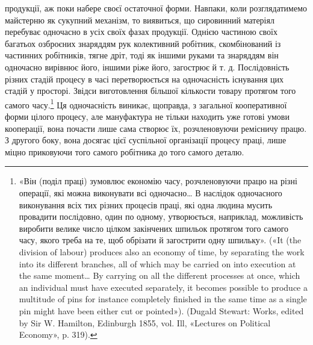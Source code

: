 \parcont{}  %
продукції, аж поки набере своєї остаточної форми. Навпаки, коли
розглядатимемо майстерню як сукупний механізм, то виявиться,
що сировинний матеріял перебуває одночасно в усіх своїх фазах
продукції. Однією частиною своїх багатьох озброєних знаряддям
рук колективний робітник, скомбінований із частинних робітників,
тягне дріт, тоді як іншими руками та знаряддям він одночасно
вирівнює його, іншими ріже його, загострює й т. д. Послідовність
різних стадій процесу в часі перетворюється на одночасність
існування цих стадій у просторі. Звідси виготовлення більшої
кількости товару протягом того самого часу.\footnote{
«Він (поділ праці) зумовлює економію часу, розчленовуючи
працю на різні операції, які можна виконувати всі одночасно\dots{} В наслідок
одночасного виконування всіх тих різних процесів праці, які одна
людина мусить провадити послідовно, один по одному, утворюється,
наприклад, можливість виробити велике число цілком закінчених
шпильок протягом того самого часу, якого треба на те, щоб обрізати й
загострити одну шпильку». («It (the division of labour) produces also
an economy of time, by separating the work into its different branches, all
of which may be carried on into execution at the same moment\dots{} By carrying
on all the different processes at once, which an individual must have
executed separately, it becomes possible to produce a multitude of pins
for instance completely finished in the same time as a single pin might
have been either cut or pointed»). (Dugald Stewart: Works, edited
by Sir W. Hamilton, Edinburgh 1855, vol. Ill, «Lectures on Political
Economy», p. 319).
} Ця одночасність
виникає, щоправда, з загальної кооперативної форми цілого
процесу, але мануфактура не тільки находить уже готові умови
кооперації, вона почасти лише сама створює їх, розчленовуючи
ремісничу працю. З другого боку, вона досягає цієї суспільної
організації процесу праці, лише міцно приковуючи того самого
робітника до того самого деталю.

